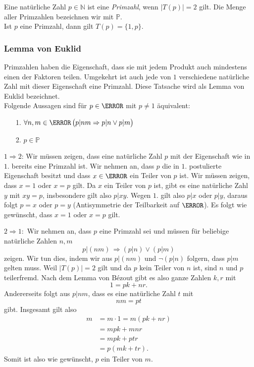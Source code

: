 Eine natürliche Zahl $p \in \mathbb{N}$ ist eine \textit{Primzahl}, wenn $|T(p)|=2$ gilt. Die Menge aller Primzahlen bezeichnen wir mit $\mathbb{P}$. \\
Ist $p$ eine Primzahl, dann gilt $T(p)=\{1,p\}$.\\

\subsubsection{Lemma von Euklid}
Primzahlen haben die Eigenschaft, dass sie mit jedem Produkt auch mindestens einen der Faktoren teilen. Umgekehrt ist auch jede von $1$ verschiedene natürliche Zahl mit dieser Eigenschaft eine Primzahl. Diese Tatsache wird als Lemma von Euklid bezeichnet.
\\

Folgende Aussagen sind für $p\in\N$ mit $p\neq 1$ äquivalent:
\begin{enumerate}
\item[1.] $\forall n,m\in\N\,\big(p|nm\Rightarrow p|n\vee p|m\big)$
\item[2.] $p\in\mathbb{P}$
\end{enumerate}

 $1\Rightarrow 2$: Wir müssen zeigen, dass eine natürliche Zahl $p$ mit der Eigenschaft wie in $1.$ bereits eine Primzahl ist. Wir nehmen an, dass $p$ die in $1.$ postulierte Eigenschaft besitzt und dass $x\in \N$ ein Teiler von $p$ ist. Wir müssen zeigen, dass $x=1$ oder $x=p$ gilt. Da $x$ ein Teiler von $p$ ist, gibt es eine natürliche Zahl $y$ mit $xy=p$, insbesondere gilt also $p|xy$. Wegen $1.$ gilt also $p|x$ oder $p|y$, daraus folgt $p=x$ oder $p=y$ (Antisymmetrie der Teilbarkeit auf $\N$). Es folgt wie gewünscht, dass $x=1$ oder $x=p$ gilt.

$2\Rightarrow 1:$ Wir nehmen an, dass $p$ eine Primzahl sei und müssen für beliebige natürliche Zahlen $n,m$
\[
p|(nm)\,\Rightarrow (p|n)\lor(p|m)
\]
zeigen. Wir tun dies, indem wir aus $p|(nm)$ und $\neg (p|n)$ folgern, dass $p|m$ gelten muss. Weil $|T(p)|=2$ gilt und da $p$ kein Teiler von $n$ ist, sind $n$ und $p$ teilerfremd. Nach dem Lemma von Bézout gibt es also ganze Zahlen $k,r$ mit
\[
 1=pk+nr.
\]
Andererseits folgt aus $p|nm$, dass es eine natürliche Zahl $t$ mit
\[
 nm=pt
\]
gibt. Insgesamt gilt also
\begin{align*}
m&=m\cdot 1=m(pk+nr)\\
&=mpk+mnr\\
&=mpk+ptr\\
&=p(mk+tr).
\end{align*}
Somit ist also wie gewünscht, $p$ ein Teiler von $m$.

